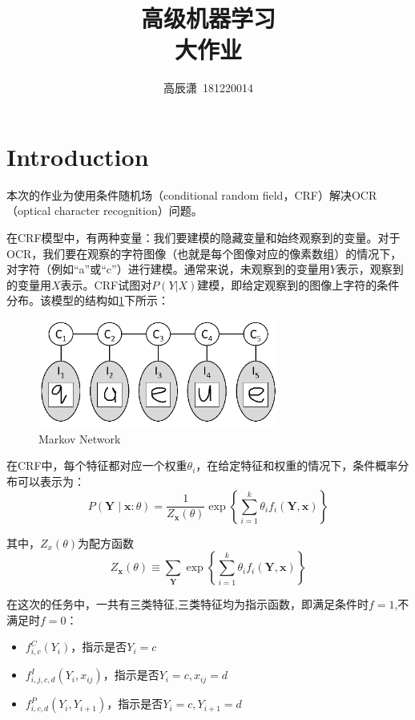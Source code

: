 \documentclass[a4paper,UTF8]{article}
\numberwithin{equation}{section}
\begin{document}
\title{高级机器学习\\
大作业}
\author{高辰潇\, 181220014} 
\maketitle


\newpage
\section{Introduction}
本次的作业为使用条件随机场（conditional random field，CRF）解决OCR（optical character recognition）问题。

在CRF模型中，有两种变量：我们要建模的隐藏变量和始终观察到的变量。对于OCR，我们要在观察的字符图像（也就是每个图像对应的像素数组）的情况下，对字符（例如“a”或“c”）进行建模。通常来说，未观察到的变量用$Y$表示，观察到的变量用$X$表示。CRF试图对$P(Y|X)$建模，即给定观察到的图像上字符的条件分布。该模型的结构如\ref{Fig.main1}下所示：
\begin{figure}[h] 
\centering
\includegraphics[width=0.7\textwidth]{figs/fig0.png} 
\caption{Markov Network} 
\label{Fig.main1}
\end{figure}

在CRF中，每个特征都对应一个权重$\theta_i$，在给定特征和权重的情况下，条件概率分布可以表示为：
\begin{equation}
P(\mathbf{Y} \mid \mathbf{x}: \theta)=\frac{1}{Z_{\mathbf{x}}(\theta)} \exp \left\{\sum_{i=1}^{k} \theta_{i} f_{i}\left(\mathbf{Y}, \mathbf{x}\right)\right\}\label{eq1}
\end{equation}

其中，$Z_x(\theta)$为配方函数
\begin{equation}
Z_{\mathbf{x}}(\theta) \equiv \sum_{\mathbf{Y}} \exp \left\{\sum_{i=1}^{k} \theta_{i} f_{i}\left(\mathbf{Y}, \mathbf{x}\right)\right\}
\end{equation}

在这次的任务中，一共有三类特征,三类特征均为指示函数，即满足条件时$f=1$,不满足时$f=0$：
\begin{itemize}
    \item $f_{i, c}^{C}\left(Y_{i}\right)$，指示是否$Y_i = c$
    \item $f_{i, j, c, d}^{I}\left(Y_{i}, x_{i j}\right)$，指示是否$Y_i=c,x_{ij}=d$
    \item $f_{i, c, d}^{P}\left(Y_{i}, Y_{i+1}\right)$，指示是否$Y_i=c,Y_{i+1}=d$
\end{itemize}
\end{document}

